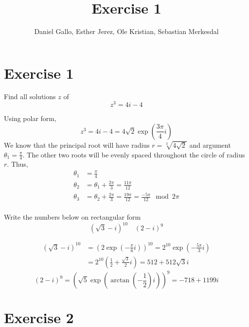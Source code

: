 \documentclass{report}
\title{Exercise 1}
\author{Daniel Gallo, Esther Jerez, Ole Kristian, Sebastian Merkesdal}
\renewcommand{\exp}[1]{\operatorname{exp} \left(#1\right)}
\renewcommand{\arctan}[1]{\operatorname{arctan} \left(#1\right)}
\begin{document}
    \maketitle
    
    \section*{Exercise 1}
    \begin{tcolorbox}[title=Part a]
        Find all solutions $z$ of
        \begin{equation*}
            z^3 = 4i - 4
        \end{equation*}
    \end{tcolorbox}
    \noindent
    Using polar form,
    \begin{equation*}
        z^3 = 4i - 4 = 4\sqrt{2}\exp{\frac{3\pi}{4}i}
    \end{equation*}
    We know that the principal root will have radius $r = \sqrt[3]{4\sqrt{2}}$ and argument $\theta_1 = \frac{\pi}{4}$. The other two roots will be evenly spaced throughout the circle of radius $r$. Thus,
    \begin{align*}
        \theta_1 &= \frac{\pi}{4} \\
        \theta_2 &= \theta_1 + \frac{2\pi}{3} = \frac{11\pi}{12} \\
        \theta_3 &= \theta_2 + \frac{2\pi}{3} = \frac{19\pi}{12} = \frac{-5\pi}{12} \mod{2\pi}\\
    \end{align*}
    \begin{tcolorbox}[title=Part b]
        Write the numbers below on rectangular form
        \begin{equation*}
            (\sqrt{3} - i)^{10} \quad (2 - i)^{9}
        \end{equation*}
    \end{tcolorbox}
    \begin{align*}
        (\sqrt{3} - i)^{10} &= \left(2\exp{-\frac{\pi}{6}i}\right)^{10} = 2^{10}\exp{-\frac{5\pi}{3}i} \\
        &= 2^{10}\left(\frac{1}{2} + \frac{\sqrt{3}}{2}i\right) = 512 + 512\sqrt{3}i
    \end{align*}
    \begin{equation*}
        (2 - i)^{9} = \left(\sqrt{5}\exp{\arctan{-\frac{1}{2}}i}\right)^{9} = -718 + 1199i
    \end{equation*}
    \section*{Exercise 2}
\end{document}
